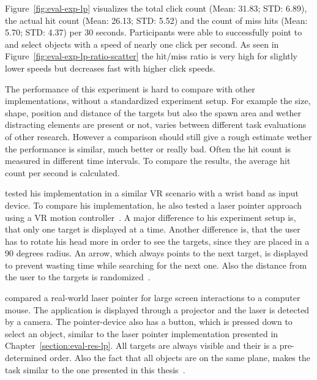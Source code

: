 Figure~\ref{fig:eval-exp-lp} visualizes the total click count (Mean: 31.83; \ac{STD}: 6.89), the actual hit count (Mean: 26.13; \ac{STD}: 5.52) and the count of miss hits (Mean: 5.70; \ac{STD}: 4.37) per 30 seconds. Participants were able to successfully point to and select objects with a speed of nearly one click per second. As seen in Figure~\ref{fig:eval-exp-lp-ratio-scatter} the hit/miss ratio is very high for slightly lower speeds but decreases fast with higher click speeds.

The performance of this experiment is hard to compare with other implementations, without a standardized experiment setup. For example the size, shape, position and distance of the targets but also the spawn area and wether distracting elements are present or not, varies between different task evaluations of other research. However a comparison should still give a rough estimate wether the performance is similar, much better or really bad. Often the hit count is measured in different time intervals. To compare the results, the average hit count per second is calculated.

\citeauthor{Kamm.2018} tested his implementation in a similar \ac{VR} scenario with a wrist band as input device. To compare his implementation, he also tested a laser pointer approach using a \ac{VR} motion controller~\cite[39]{Kamm.2018}. A major difference to his experiment setup is, that only one target is displayed at a time. Another difference is, that the user has to rotate his head more in order to see the targets, since they are placed in a 90 degrees radius. An arrow, which always points to the next target, is displayed to prevent wasting time while searching for the next one. Also the distance from the user to the targets is randomized~\cite[45]{Kamm.2018}.

\citeauthor{JiYoungOh.2002} compared a real-world laser pointer for large screen interactions to a computer mouse. The application is displayed through a projector and the laser is detected by a camera. The pointer-device also has a button, which is pressed down to select an object, similar to the laser pointer implementation presented in Chapter~\ref{section:eval-res-lp}. All targets are always visible and their is a pre-determined order. Also the fact that all objects are on the same plane, makes the task similar to the one presented in this thesis~\cite[3\psq]{JiYoungOh.2002}.

